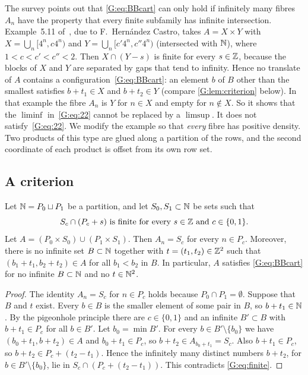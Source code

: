 The survey points out that \eqref{G:eq:BBcart} can only hold if infinitely many fibres
$A_n$ have the property that every finite subfamily has infinite intersection. Example~5.11
of~\cite{kra2023problems}, due to F.~Hern\'andez Castro, takes $A=X\times Y$ with
$X=\bigcup_n[4^n,c4^n)$ and $Y=\bigcup_n[c'4^n,c''4^n)$ (intersected with $\mathbb{N}$), where
$1<c<c'<c''<2$. Then $X\cap(Y-s)$ is finite for every $s\in\mathbb{Z}$, because the blocks of $X$ and
$Y$ are separated by gaps that tend to infinity. Hence no translate of $A$ contains a
configuration~\eqref{G:eq:BBcart}: an element $b$ of $B$ other than the smallest satisfies $b+t_1\in X$ and $b+t_2\in Y$ (compare \cref{G:lem:criterion} below). In that example the fibre $A_n$ is $Y$
for $n\in X$ and empty for $n\notin X$. So it shows that the $\liminf$ in~\eqref{G:eq:22}
cannot be replaced by a $\limsup$. It does not satisfy~\eqref{G:eq:22}. We modify the
example so that \emph{every} fibre has positive density. Two products of this type are
glued along a partition of the rows, and the second coordinate of each product is
offset from its own row set.

\subsection{A criterion}

\begin{lemma}\label{G:lem:criterion}
Let $\mathbb{N}=P_0\sqcup P_1$ be a partition, and let $S_0,S_1\subset\mathbb{N}$ be sets such that
\begin{equation}\label{G:eq:finite}
S_c\cap(P_c+s)\ \text{is finite for every } s\in\mathbb{Z}\text{ and } c\in\{0,1\}.
\end{equation}
Let $A=(P_0\times S_0)\cup(P_1\times S_1)$. Then $A_n=S_c$ for every $n\in P_c$. Moreover,
there is no infinite set $B\subset\mathbb{N}$ together with $t=(t_1,t_2)\in\mathbb{Z}^2$ such that
$(b_1+t_1,b_2+t_2)\in A$ for all $b_1<b_2$ in $B$. In particular, $A$ satisfies
\eqref{G:eq:BBcart} for no infinite $B\subset\mathbb{N}$ and no $t\in\mathbb{N}^2$.
\end{lemma}

\begin{proof}
The identity $A_n=S_c$ for $n\in P_c$ holds because $P_0\cap P_1=\emptyset$. Suppose that
$B$ and $t$ exist. Every $b\in B$ is the smaller element of some pair in $B$, so
$b+t_1\in\mathbb{N}$. By the pigeonhole principle there are $c\in\{0,1\}$ and an infinite
$B'\subset B$ with $b+t_1\in P_c$ for all $b\in B'$. Let $b_0=\min B'$. For every
$b\in B'\setminus\{b_0\}$ we have $(b_0+t_1,b+t_2)\in A$ and $b_0+t_1\in P_c$, so
$b+t_2\in A_{b_0+t_1}=S_c$. Also $b+t_1\in P_c$, so
$b+t_2\in P_c+(t_2-t_1)$. Hence the infinitely many distinct numbers $b+t_2$, for
$b\in B'\setminus\{b_0\}$, lie in $S_c\cap(P_c+(t_2-t_1))$. This contradicts
\eqref{G:eq:finite}.
\end{proof}

